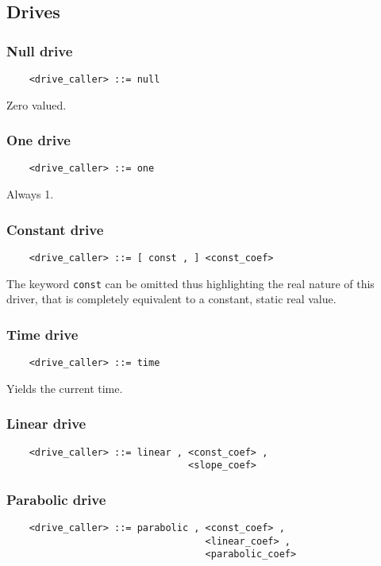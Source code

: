 \subsection{Drives}

\subsubsection{Null drive}
\begin{verbatim}
    <drive_caller> ::= null
\end{verbatim}
Zero valued.

\subsubsection{One drive}
\begin{verbatim}
    <drive_caller> ::= one
\end{verbatim}
Always 1.

\subsubsection{Constant drive}
\begin{verbatim}
    <drive_caller> ::= [ const , ] <const_coef>                    
\end{verbatim}
The keyword \texttt{const} can be omitted thus highlighting the real nature
of this driver, that is completely equivalent to a constant, static real
value.

\subsubsection{Time drive}
\begin{verbatim}
    <drive_caller> ::= time
\end{verbatim}
Yields the current time.
  
\subsubsection{Linear drive}
\begin{verbatim}
    <drive_caller> ::= linear , <const_coef> , 
                                <slope_coef>
\end{verbatim}

\subsubsection{Parabolic drive}
\begin{verbatim}
    <drive_caller> ::= parabolic , <const_coef> , 
                                   <linear_coef> , 
                                   <parabolic_coef>
\end{verbatim}

